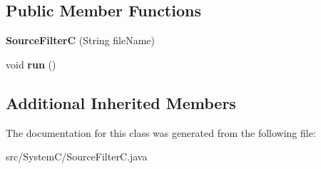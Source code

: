 \subsection*{Public Member Functions}
\begin{DoxyCompactItemize}
\item 
\hypertarget{class_system_c_1_1_source_filter_c_a6c3665b0f7fa1309c4ffa85111a4abdc}{}{\bfseries Source\+Filter\+C} (String file\+Name)\label{class_system_c_1_1_source_filter_c_a6c3665b0f7fa1309c4ffa85111a4abdc}

\item 
\hypertarget{class_system_c_1_1_source_filter_c_af114cc5a74685560174a0730287131ef}{}void {\bfseries run} ()\label{class_system_c_1_1_source_filter_c_af114cc5a74685560174a0730287131ef}

\end{DoxyCompactItemize}
\subsection*{Additional Inherited Members}


The documentation for this class was generated from the following file\+:\begin{DoxyCompactItemize}
\item 
src/\+System\+C/Source\+Filter\+C.\+java\end{DoxyCompactItemize}
